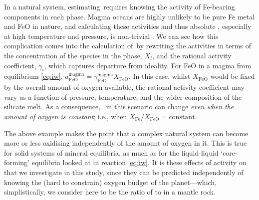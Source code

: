 In a natural system, estimating \fo\,requires knowing the activity of Fe-bearing components in each phase. Magma oceans are highly unlikely to be pure Fe metal and FeO in nature, and calculating these activities and thus absolute \fo, especially at high temperature and pressure, is non-trivial \citep[e.g.,][]{righter_redox_2012}. We can see how this complication comes into the calculation of \fo\,by rewriting the activities in terms of the concentration of the species in the phase, $X_i$, and the rational activity coefficient, $\gamma_i$, which captures departure from ideality. For FeO in a magma from equilibrium \eqref{eq:iw}, ${a^\text{magma}_\text{FeO} = \gamma^\text{magma}_\text{FeO}X_\text{FeO}}$. In this case, whilst $X_\text{FeO}$ would be fixed by the overall amount of oxygen available, the rational activity coefficient may vary as a function of pressure, temperature, and the wider composition of the silicate melt.  As a consequence, \fo\, in this scenario can change \emph{even when the amount of oxygen is constant}; i.e., when ${X_\textrm{Fe}/X_\textrm{FeO}=\textrm{constant}}$.  

The above example makes the point that a complex natural system can become more or less oxidising independently of the amount of oxygen in it. This is true for solid systems of mineral equilibria, as much as for the liquid-liquid `core-forming' equilibria looked at in reaction \eqref{eq:iw}. It is these effects of activity on \fo\,that we investigate in this study, since they can be predicted independently of knowing the (hard to constrain) oxygen budget of the planet---which, simplistically, we consider here to be the ratio of  to  in a mantle rock.


